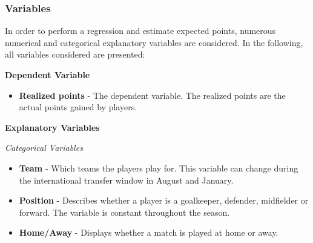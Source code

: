 \subsubsection{Variables}
In order to perform a regression and estimate expected points, numerous numerical and categorical explanatory variables are considered. In the following, all variables considered are presented: 

\newpar

\textbf{Dependent Variable}
\begin{itemize}
    \item \textbf{Realized points} - The dependent variable. The realized points are the actual points gained by players.
\end{itemize}

\textbf{Explanatory Variables}

\textit{Categorical Variables}
\newpar
\begin{itemize}
    \item \textbf{Team} - Which teams the players play for. This variable can change during the international transfer window in August and January.  
    
    \item \textbf{Position} - Describes whether a player is a goalkeeper, defender, midfielder or forward. The variable is constant throughout the season.
    \item \textbf{Home/Away} - Displays whether a match is played at home or away.
\end{itemize}
\newpar

